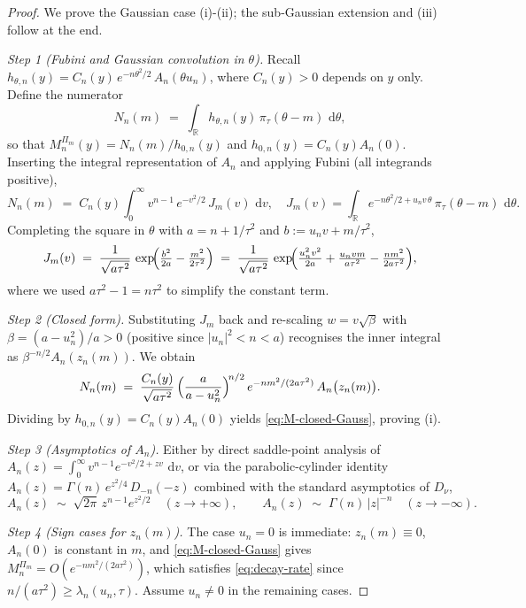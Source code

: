 \documentclass[numsec,webpdf,modern,medium,namedate]{oup-authoring-template}
\theoremstyle{thmstyleone}%
\theoremstyle{thmstyletwo}%
\theoremstyle{thmstylethree}%
\newcommand{\dd}{\,\mathrm{d}}
\newcommand{\1}{\mathbf{1}}
\begin{document}
\begin{proof}
    We prove the Gaussian case (i)-(ii); the sub-Gaussian extension and (iii) follow at the end.
 
\emph{Step 1 (Fubini and Gaussian convolution in $\theta$).} Recall $h_{\theta,n}(y) = C_{n}(y)\, e^{-n\theta^{2}/2}\, A_{n}(\theta u_{n})$, where $C_{n}(y)>0$ depends on $y$ only. Define the numerator
\[
   N_{n}(m) \;=\; \int_{\mathbb R} h_{\theta,n}(y)\,\pi_{\tau}(\theta-m)\,\dd\theta,
\]
so that $M_{n}^{\Pi_{m}}(y)=N_{n}(m)/h_{0,n}(y)$ and $h_{0,n}(y)=C_{n}(y)A_{n}(0)$. Inserting the integral representation of $A_{n}$ and applying Fubini (all integrands positive),
\[
   N_{n}(m) \;=\; C_{n}(y)\int_{0}^{\infty}v^{n-1}\,e^{-v^{2}/2}\, J_{m}(v)\,\dd v,
   \quad
   J_{m}(v)=\int_{\mathbb R} e^{-n\theta^{2}/2+u_{n}v\,\theta}\,\pi_{\tau}(\theta-m)\,\dd\theta.
\]
Completing the square in $\theta$ with $a=n+1/\tau^{2}$ and $b:=u_{n}v+m/\tau^{2}$,
\[
   J_{m}(v) \;=\; \frac{1}{\sqrt{a\tau^{2}}}\, \exp\!\Bigl(\tfrac{b^{2}}{2a}-\tfrac{m^{2}}{2\tau^{2}}\Bigr)
   \;=\; \frac{1}{\sqrt{a\tau^{2}}}\, \exp\!\Bigl(\tfrac{u_{n}^{2}v^{2}}{2a}+\tfrac{u_{n}vm}{a\tau^{2}}-\tfrac{nm^{2}}{2a\tau^{2}}\Bigr),
\]
where we used $a\tau^{2}-1=n\tau^{2}$ to simplify the constant term.

\emph{Step 2 (Closed form).} Substituting $J_{m}$ back and re-scaling $w=v\sqrt{\beta}$ with $\beta =(a-u_{n}^{2})/a>0$ (positive since $|u_{n}|^{2}<n<a$) recognises the inner integral as $\beta^{-n/2}A_{n}(z_{n}(m))$. We obtain
\[
   N_{n}(m) \;=\; \frac{C_{n}(y)}{\sqrt{a\tau^{2}}}\,\Bigl(\frac{a}{a-u_{n}^{2}}\Bigr)^{\!n/2}\, e^{-nm^{2}/(2a\tau^{2})}\, A_{n}\bigl(z_{n}(m)\bigr).
\]
Dividing by $h_{0,n}(y)=C_{n}(y)A_{n}(0)$ yields \eqref{eq:M-closed-Gauss}, proving (i).

\emph{Step 3 (Asymptotics of $A_{n}$).} Either by direct saddle-point analysis of $A_{n}(z)=\int_{0}^{\infty}v^{n-1}e^{-v^{2}/2+zv}\,\dd v$, or via the parabolic-cylinder identity $A_{n}(z)=\Gamma(n)\,e^{z^{2}/4}\,D_{-n}(-z)$ combined with the standard asymptotics of $D_{\nu}$,
\begin{equation}\label{eq:An-asymptotics}
   A_{n}(z)\;\sim\;\sqrt{2\pi}\,z^{n-1}e^{z^{2}/2}\quad (z\to+\infty),
   \qquad
   A_{n}(z)\;\sim\;\Gamma(n)\,|z|^{-n}\quad (z\to-\infty).
\end{equation}

\emph{Step 4 (Sign cases for $z_{n}(m)$).} The case $u_{n}=0$ is immediate: $z_{n}(m)\equiv 0$, $A_{n}(0)$ is constant in $m$, and \eqref{eq:M-closed-Gauss} gives $M_{n}^{\Pi_{m}}=O(e^{-nm^{2}/(2a\tau^{2})})$, which satisfies \eqref{eq:decay-rate} since $n/(a\tau^{2})\ge \lambda_{n}(u_{n},\tau)$. Assume $u_{n}\ne 0$ in the remaining cases.
 

\end{proof}
\end{document}
